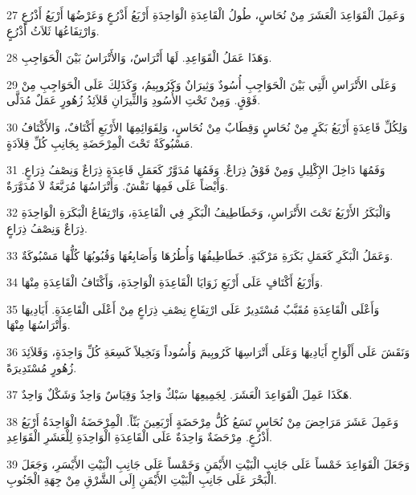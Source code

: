 \par 27 وَعَمِلَ الْقَوَاعِدَ الْعَشَرَ مِنْ نُحَاسٍ، طُولُ الْقَاعِدَةِ الْوَاحِدَةِ أَرْبَعُ أَذْرُعٍ وَعَرْضُهَا أَرْبَعُ أَذْرُعٍ وَارْتِفَاعُهَا ثَلاَثُ أَذْرُعٍ.
\par 28 وَهَذَا عَمَلُ الْقَوَاعِدِ. لَهَا أَتْرَاسٌ، وَالأَتْرَاسُ بَيْنَ الْحَوَاجِبِ.
\par 29 وَعَلَى الأَتْرَاسِ الَّتِي بَيْنَ الْحَوَاجِبِ أُسُودٌ وَثِيرَانٌ وَكَرُوبِيمُ، وَكَذَلِكَ عَلَى الْحَوَاجِبِ مِنْ فَوْقٍ. وَمِنْ تَحْتِ الأُسُودِ وَالثِّيرَانِ قَلاَئِدُ زُهُورٍ عَمَلٌ مُدَلَّى.
\par 30 وَلِكُلِّ قَاعِدَةٍ أَرْبَعُ بَكَرٍ مِنْ نُحَاسٍ وَقِطَابٌ مِنْ نُحَاسٍ، وَلِقَوَائِمِهَا الأَرْبَعِ أَكْتَافٌ، وَالأَكْتَافُ مَسْبُوكَةٌ تَحْتَ الْمِرْحَضَةِ بِجَانِبِ كُلِّ قِلاَدَةٍ.
\par 31 وَفَمُهَا دَاخِلَ الإِكْلِيلِ وَمِنْ فَوْقُ ذِرَاعٌ. وَفَمُهَا مُدَوَّرٌ كَعَمَلِ قَاعِدَةٍ ذِرَاعٌ وَنِصْفُ ذِرَاعٍ. وَأَيْضاً عَلَى فَمِهَا نَقْشٌ. وَأَتْرَاسُهَا مُرَبَّعَةٌ لاَ مُدَوَّرَةٌ.
\par 32 وَالْبَكَرُ الأَرْبَعُ تَحْتَ الأَتْرَاسِ، وَخَطَاطِيفُ الْبَكَرِ فِي الْقَاعِدَةِ، وَارْتِفَاعُ الْبَكَرَةِ الْوَاحِدَةِ ذِرَاعٌ وَنِصْفُ ذِرَاعٍ.
\par 33 وَعَمَلُ الْبَكَرِ كَعَمَلِ بَكَرَةِ مَرْكَبَةٍ. خَطَاطِيفُهَا وَأُطُرُهَا وَأَصَابِعُهَا وَقُبُوبُهَا كُلُّهَا مَسْبُوكَةٌ.
\par 34 وَأَرْبَعُ أَكْتَافٍ عَلَى أَرْبَعِ زَوَايَا الْقَاعِدَةِ الْوَاحِدَةِ، وَأَكْتَافُ الْقَاعِدَةِ مِنْهَا.
\par 35 وَأَعْلَى الْقَاعِدَةِ مُقَبَّبٌ مُسْتَدِيرٌ عَلَى ارْتِفَاعِ نِصْفِ ذِرَاعٍ مِنْ أَعْلَى الْقَاعِدَةِ. أَيَادِيهَا وَأَتْرَاسُهَا مِنْهَا.
\par 36 وَنَقَشَ عَلَى أَلْوَاحِ أَيَادِيهَا وَعَلَى أَتْرَاسِهَا كَرُوبِيمَ وَأُسُوداً وَنَخِيلاً كَسِعَةِ كُلِّ وَاحِدَةٍ، وَقَلاَئِدَ زُهُورٍ مُسْتَدِيرَةً.
\par 37 هَكَذَا عَمِلَ الْقَوَاعِدَ الْعَشَرَ. لِجَمِيعِهَا سَبْكٌ وَاحِدٌ وَقِيَاسٌ وَاحِدٌ وَشَكْلٌ وَاحِدٌ.
\par 38 وَعَمِلَ عَشَرَ مَرَاحِضَ مِنْ نُحَاسٍ تَسَعُ كُلُّ مِرْحَضَةٍ أَرْبَعِينَ بَثّاً. الْمِرْحَضَةُ الْوَاحِدَةُ أَرْبَعُ أَذْرُعٍ. مِرْحَضَةٌ وَاحِدَةٌ عَلَى الْقَاعِدَةِ الْوَاحِدَةِ لِلْعَشَرِ الْقَوَاعِدِ.
\par 39 وَجَعَلَ الْقَوَاعِدَ خَمْساً عَلَى جَانِبِ الْبَيْتِ الأَيْمَنِ وَخَمْساً عَلَى جَانِبِ الْبَيْتِ الأَيْسَرِ، وَجَعَلَ الْبَحْرَ عَلَى جَانِبِ الْبَيْتِ الأَيْمَنِ إِلَى الشَّرْقِ مِنْ جِهَةِ الْجَنُوبِ.
